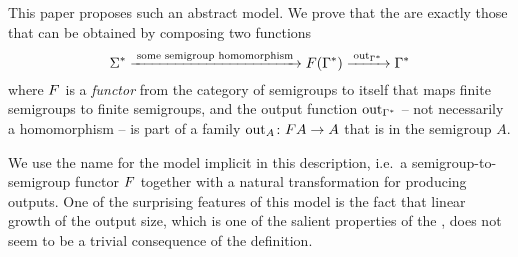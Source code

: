 This paper proposes such an abstract model.  We prove that the  are exactly those that can be obtained by composing two functions
\[ \Sigma^* 
  \xrightarrow{\;\text{some semigroup homomorphism}\;}
    \functor(\Gamma^*)
    \xrightarrow{\;\outfun_{\Gamma^*}\;}
    \Gamma^*
\]
where $\functor$ is a \emph{functor} from the category of semigroups to itself that
maps finite semigroups to finite semigroups, and the output function
$\mathrm{out}_{\Gamma^*}$ -- not necessarily a homomorphism -- is part of a family
$\outfun_A\colon \functor A \to A$ that is  in the semigroup $A$.

We use the name  for the model implicit in this
description, i.e.~a semigroup-to-semigroup functor $\functor$ together with a
natural transformation for producing outputs. One of the surprising features of
this model is the fact that linear growth of the output size, which is one of
the salient properties of the , does not
seem to be a trivial consequence of the definition.



